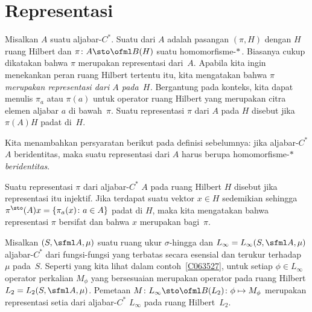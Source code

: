 \section{Representasi}
\begin{defn}\label{0028} Misalkan $A$ suatu aljabar-$C^*$. Suatu
 dari $A$ adalah pasangan $(\pi,H)$ dengan $H$ ruang Hilbert dan $\pi
\colon A \sto \ofml B(H)$ suatu homomorfisme-$*\,$. Biasanya cukup dikatakan bahwa $\pi$ merupakan
representasi dari~$A$. Apabila kita ingin menekankan peran ruang Hilbert tertentu itu,
kita mengatakan bahwa $\pi$ \emph{merupakan representasi dari $A$ pada~$H$.} Bergantung pada konteks, kita
dapat menulis $\pi_a$ atau $\pi(a)$ untuk operator ruang Hilbert yang merupakan citra
elemen aljabar $a$ di bawah~$\pi$. Suatu representasi $\pi$ dari $A$ pada $H$ disebut
 jika $\pi(A)H$ padat di~$H$.
\end{defn}

\begin{conv} Kita menambahkan persyaratan berikut pada definisi sebelumnya: jika aljabar-$C^*$
$A$ beridentitas, maka suatu representasi dari $A$ harus berupa homomorfisme-$*\,$ \emph{beridentitas}.
\end{conv}

\begin{defn} Suatu representasi $\pi$ dari aljabar-$C^*$ $A$ pada ruang Hilbert $H$ disebut
 jika representasi itu injektif. Jika terdapat suatu vektor $x \in H$ sedemikian sehingga
$\pi^{\sto}(A)x = \{\pi_a(x)\colon a \in A\}$ padat di $H$, maka kita mengatakan bahwa
representasi $\pi$ bersifat
 dan bahwa $x$ merupakan
 bagi~$\pi$.
\end{defn}

\begin{exam}\label{002802} Misalkan $(S, \sfml A, \mu)$ suatu ruang ukur $\sigma$-hingga dan
$L_\infty = L_\infty(S, \sfml A, \mu)$ aljabar-$C^*$ dari fungsi-fungsi yang terbatas secara esensial dan
terukur terhadap $\mu$ pada~$S$. Seperti yang kita lihat dalam contoh~\ref{C063527}, untuk setiap $\phi \in
L_\infty$ operator perkalian $M_\phi$ yang bersesuaian merupakan operator pada
ruang Hilbert $L_2 = L_2(S, \sfml A, \mu)$. Pemetaan $M\colon L_\infty \sto \ofml
B(L_2)\colon \phi \mapsto M_\phi$ merupakan representasi setia dari aljabar-$C^*$
$L_\infty$ pada ruang Hilbert~$L_2$.
\end{exam}

